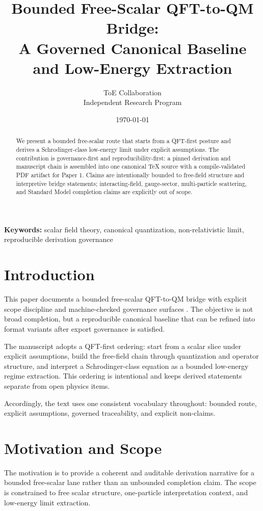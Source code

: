 \documentclass[11pt]{article}
\title{Bounded Free-Scalar QFT-to-QM Bridge: \\A Governed Canonical Baseline and Low-Energy Extraction}
\author{ToE Collaboration\\Independent Research Program}
\date{\today}
\begin{document}
\maketitle

\begin{abstract}
We present a bounded free-scalar route that starts from a QFT-first posture and derives a Schrodinger-class low-energy limit under explicit assumptions. The contribution is governance-first and reproducibility-first: a pinned derivation and manuscript chain is assembled into one canonical TeX source with a compile-validated PDF artifact for Paper 1. Claims are intentionally bounded to free-field structure and interpretive bridge statements; interacting-field, gauge-sector, multi-particle scattering, and Standard Model completion claims are explicitly out of scope.
\end{abstract}

\noindent\textbf{Keywords:} scalar field theory, canonical quantization, non-relativistic limit, reproducible derivation governance

\section{Introduction}
This paper documents a bounded free-scalar QFT-to-QM bridge with explicit scope discipline and machine-checked governance surfaces \cite{toescalarroute}. The objective is not broad completion, but a reproducible canonical baseline that can be refined into format variants after export governance is satisfied.

The manuscript adopts a QFT-first ordering: start from a scalar slice under explicit assumptions, build the free-field chain through quantization and operator structure, and interpret a Schrodinger-class equation as a bounded low-energy regime extraction. This ordering is intentional and keeps derived statements separate from open physics items.

Accordingly, the text uses one consistent vocabulary throughout: bounded route, explicit assumptions, governed traceability, and explicit non-claims.

\section{Motivation and Scope}
The motivation is to provide a coherent and auditable derivation narrative for a bounded free-scalar lane rather than an unbounded completion claim. The scope is constrained to free scalar structure, one-particle interpretation context, and low-energy limit extraction.
\end{document}
